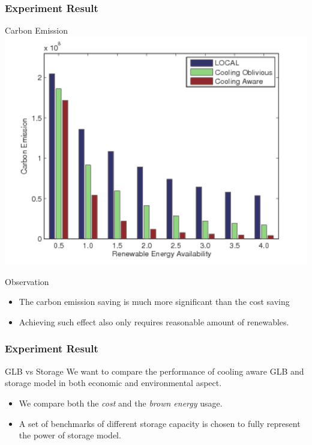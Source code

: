 \documentclass[xcolor=dvipsnames]{beamer}
\begin{document}
\begin{frame}
\frametitle{Experiment Result}
\begin{block}
{Carbon Emission}
\includegraphics[scale = 0.38]{carbon_summer.pdf}
\end{block}
\begin{block}
{Observation}
\begin{itemize}
\item
The carbon emission saving is much more significant than the cost saving
\item
Achieving such effect also only requires reasonable amount of renewables.
\end{itemize}
\end{block}
\end{frame}
%
%
\begin{frame}
\frametitle{Experiment Result}
\begin{block}
{GLB vs Storage}
We want to compare the performance of cooling aware GLB and storage model in both economic and environmental aspect.
\begin{itemize}
\item
We compare both the \emph{cost} and the \emph{brown energy} usage.
\item
A set of benchmarks of different storage capacity is chosen to fully represent the power of storage model.
\end{itemize}
\end{block}
\end{frame}
%
%
\end{document}

